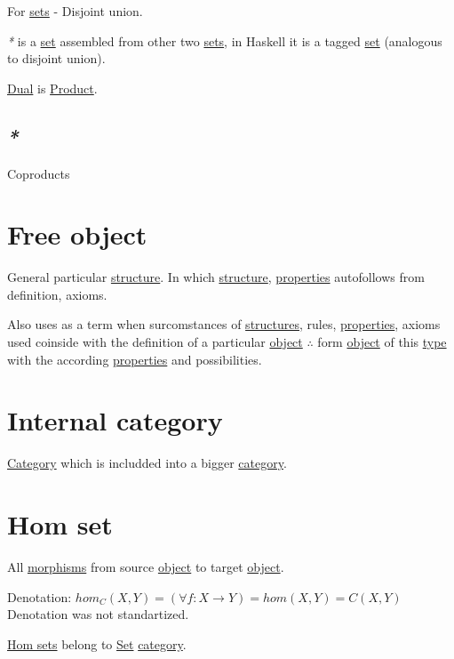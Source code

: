 \documentclass[a4paper,14pt,oneside]{book}
\begin{document}
For \hyperref[org8162ad1]{sets} - Disjoint union.

\emph{*} is a \hyperref[org28abdc9]{set} assembled from other two \hyperref[org8162ad1]{sets}, in Haskell it is a tagged \hyperref[org28abdc9]{set} (analogous to disjoint union).

\hyperref[orgef9bcb8]{Dual} is \hyperref[org917411a]{Product}.

\subsection{\emph{*}}
\label{sec:org4b2519b}

\label{org105afe2}Coproducts

\section{\label{orgdcfea79}Free object}
\label{sec:orgdaed8ef}
General particular \hyperref[org105c77d]{structure}.
In which \hyperref[org105c77d]{structure}, \hyperref[orgaebb0b7]{properties} autofollows from definition, axioms.

Also uses as a term when surcomstances of \hyperref[orgbfc87b3]{structures}, rules, \hyperref[orgaebb0b7]{properties}, axioms used coinside with the definition of a particular \hyperref[org8d6cd26]{object} \(\therefore\) form \hyperref[org8d6cd26]{object} of this \hyperref[orgde40363]{type} with the according \hyperref[orgaebb0b7]{properties} and possibilities.

\section{\label{org2d6177f}Internal category}
\label{sec:orgc8e5905}
\hyperref[org82baa03]{Category} which is includded into a bigger \hyperref[org82baa03]{category}.

\section{\label{orga768c9b}Hom set}
\label{sec:org32b9ae6}
All \hyperref[orgfb70910]{morphisms} from source \hyperref[org8d6cd26]{object} to target \hyperref[org8d6cd26]{object}.

Denotation:
\(hom_{C}(X,Y) = (\forall f: X \to Y) = hom(X,Y) = C(X,Y)\)
Denotation was not standartized.

\hyperref[org2b0d9df]{Hom sets} belong to \hyperref[org28abdc9]{Set} \hyperref[org82baa03]{category}.
\end{document}
